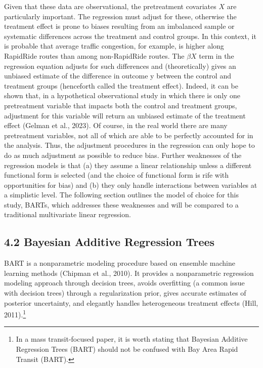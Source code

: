 \documentclass[
  12pt,
]{article}
\begin{document}
Given that these data are observational, the pretreatment covariates
\(X\) are particularly important. The regression must adjust for these,
otherwise the treatment effect is prone to biases resulting from an
imbalanced sample or systematic differences across the treatment and
control groups. In this context, it is probable that average traffic
congestion, for example, is higher along RapidRide routes than among
non-RapidRide routes. The \(\beta X\) term in the regression equation
adjusts for such differences and (theoretically) gives an unbiased
estimate of the difference in outcome y between the control and
treatment groups (henceforth called the treatment effect). Indeed, it
can be shown that, in a hypothetical observational study in which there
is only one pretreatment variable that impacts both the control and
treatment groups, adjustment for this variable will return an unbiased
estimate of the treatment effect (Gelman et al., 2023). Of course, in
the real world there are many pretreatment variables, not all of which
are able to be perfectly accounted for in the analysis. Thus, the
adjustment procedures in the regression can only hope to do as much
adjustment as possible to reduce bias. Further weaknesses of the
regression models is that (a) they assume a linear relationship unless a
different functional form is selected (and the choice of functional form
is rife with opportunities for bias) and (b) they only handle
interactions between variables at a simplistic level. The following
section outlines the model of choice for this study, BARTs, which
addresses these weaknesses and will be compared to a traditional
multivariate linear regression.

\subsection{4.2 Bayesian Additive Regression
Trees}\label{bayesian-additive-regression-trees}

BART is a nonparametric modeling procedure based on ensemble machine
learning methods (Chipman et al., 2010). It provides a nonparametric
regression modeling approach through decision trees, avoids overfitting
(a common issue with decision trees) through a regularization prior,
gives accurate estimates of posterior uncertainty, and elegantly handles
heterogeneous treatment effects (Hill, 2011).\footnote{In a mass
  transit-focused paper, it is worth stating that Bayesian Additive
  Regression Trees (BART) should not be confused with Bay Area Rapid
  Transit (BART).}
\end{document}
